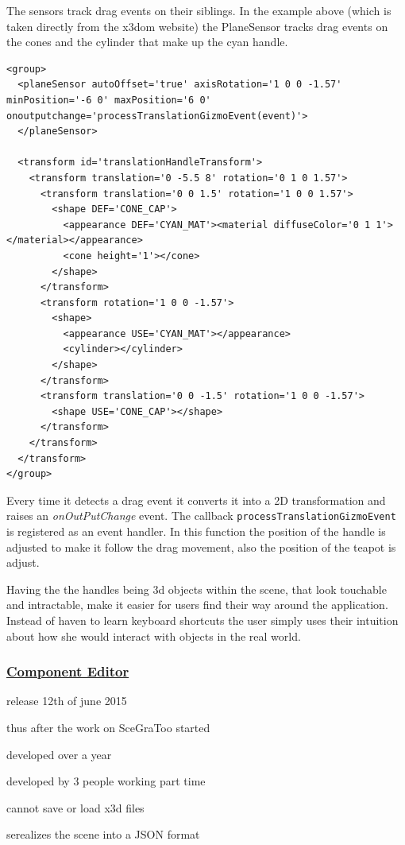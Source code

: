 The sensors track drag events on their siblings. In the example above
(which is taken directly from the x3dom website) the PlaneSensor tracks
drag events on the cones and the cylinder that make up the cyan handle.

\begin{verbatim}
<group>
  <planeSensor autoOffset='true' axisRotation='1 0 0 -1.57' minPosition='-6 0' maxPosition='6 0' onoutputchange='processTranslationGizmoEvent(event)'>
  </planeSensor>

  <transform id='translationHandleTransform'>
    <transform translation='0 -5.5 8' rotation='0 1 0 1.57'>
      <transform translation='0 0 1.5' rotation='1 0 0 1.57'>
        <shape DEF='CONE_CAP'>
          <appearance DEF='CYAN_MAT'><material diffuseColor='0 1 1'></material></appearance>
          <cone height='1'></cone>
        </shape>
      </transform>
      <transform rotation='1 0 0 -1.57'>
        <shape>
          <appearance USE='CYAN_MAT'></appearance>
          <cylinder></cylinder>
        </shape>
      </transform>
      <transform translation='0 0 -1.5' rotation='1 0 0 -1.57'>
        <shape USE='CONE_CAP'></shape>
      </transform>
    </transform>
  </transform>
</group>
\end{verbatim}

Every time it detects a drag event it converts it into a 2D
transformation and raises an \emph{onOutPutChange} event. The callback
\texttt{processTranslationGizmoEvent} is registered as an event handler.
In this function the position of the handle is adjusted to make it
follow the drag movement, also the position of the teapot is adjust.

Having the the handles being 3d objects within the scene, that look
touchable and intractable, make it easier for users find their way
around the application. Instead of haven to learn keyboard shortcuts the
user simply uses their intuition about how she would interact with
objects in the real world.

\subsubsection{\texorpdfstring{\href{https://github.com/x3dom/component-editor}{Component
Editor}}{Component Editor}}\label{component-editor30}

\begin{itemize*}
\item
  release 12th of june 2015
\item
  thus after the work on SceGraToo started
\item
  developed over a year
\item
  developed by 3 people working part time
\item
  cannot save or load x3d files
\item
  serealizes the scene into a JSON format
\end{itemize*}

